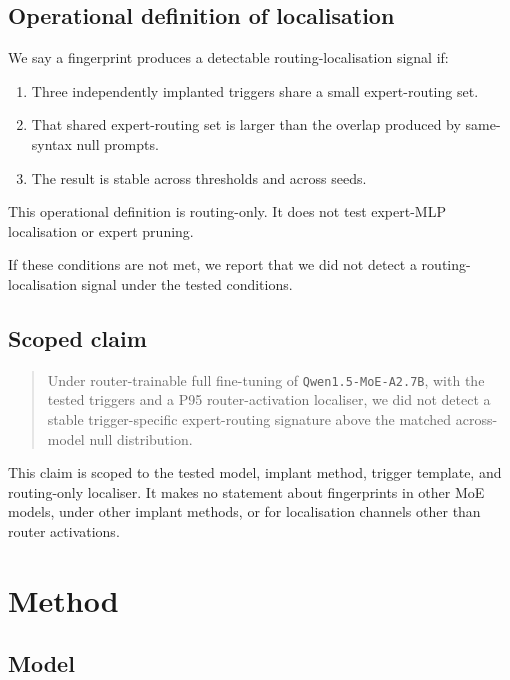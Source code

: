 \documentclass[
  11pt,
  a4paper,
]{article}
\providecommand{\tightlist}{%
  \setlength{\itemsep}{0pt}\setlength{\parskip}{0pt}}
\begin{document}
\subsection{Operational definition of
localisation}\label{operational-definition-of-localisation}

We say a fingerprint produces a detectable routing-localisation signal
if:

\begin{enumerate}
\def\labelenumi{\arabic{enumi}.}
\tightlist
\item
  Three independently implanted triggers share a small expert-routing
  set.
\item
  That shared expert-routing set is larger than the overlap produced by
  same-syntax null prompts.
\item
  The result is stable across thresholds and across seeds.
\end{enumerate}

This operational definition is routing-only. It does not test expert-MLP
localisation or expert pruning.

If these conditions are not met, we report that we did not detect a
routing-localisation signal under the tested conditions.

\subsection{Scoped claim}\label{scoped-claim}

\begin{quote}
Under router-trainable full fine-tuning of \texttt{Qwen1.5-MoE-A2.7B},
with the tested triggers and a P95 router-activation localiser, we did
not detect a stable trigger-specific expert-routing signature above the
matched across-model null distribution.
\end{quote}

This claim is scoped to the tested model, implant method, trigger
template, and routing-only localiser. It makes no statement about
fingerprints in other MoE models, under other implant methods, or for
localisation channels other than router activations.

\section{Method}\label{method}

\subsection{Model}\label{model}
\end{document}
